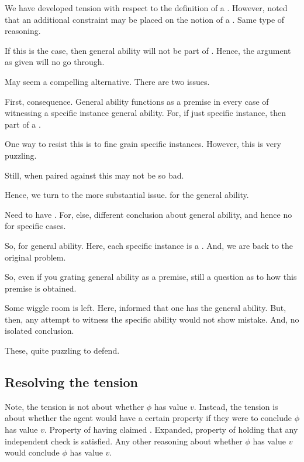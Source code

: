 \begin{note}
  We have developed tension with respect to the definition of a \requ{}.
  However, noted that an additional constraint may be placed on the notion of a \requ{}.
  Same type of reasoning.

  If this is the case, then general ability will not be part of \cluster{}.
  Hence, the argument as given will no go through.

  May seem a compelling alternative.
  There are two issues.

  First, consequence.
  General ability functions as a premise in every case of witnessing a specific instance general ability.
  For, if just specific instance, then part of a \cluster{}.

  One way to resist this is to fine grain specific instances.
  However, this is very puzzling.

  Still, when paired against \EAS{} this may not be so bad.

  Hence, we turn to the more substantial issue.
   for the general ability.

  Need to have .
  For, else, different conclusion about general ability, and hence no \csVImp{} for specific cases.

  So, \csVImp{} for general ability.
  Here, each specific instance is a \requ{}.
  And, we are back to the original problem.

  So, even if you grating general ability as a premise, still a question as to how this premise is obtained.

  Some wiggle room is left.
  Here, informed that one has the general ability.
  But, then, any attempt to witness the specific ability would not show mistake.
  And, no isolated conclusion.

  These, quite puzzling to defend.
\end{note}


\subsection{Resolving the tension}
\label{sec:overview:resolving-tension}

\begin{note}
  Note, the tension is not about whether \(\phi\) has value \(v\).
  Instead, the tension is about whether the agent would have a certain property if they were to conclude \(\phi\) has value \(v\).
  Property of having claimed \support{}.
  Expanded, property of holding that any independent check is satisfied.
  Any other reasoning about whether \(\phi\) has value \(v\) would conclude \(\phi\) has value \(v\).
\end{note}

